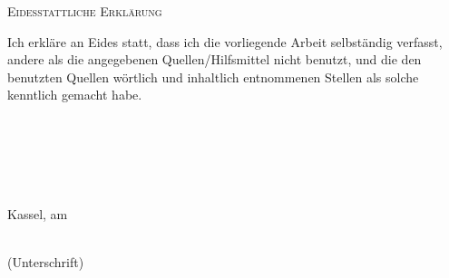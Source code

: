 \thispagestyle{empty}
\begin{center}
    \Large\scshape Eidesstattliche Erklärung
\end{center}
Ich erkläre an Eides statt, dass ich die vorliegende Arbeit selbständig
verfasst, andere als die angegebenen Quellen/Hilfsmittel nicht benutzt, und die
den benutzten Quellen wörtlich und inhaltlich entnommenen Stellen als solche
kenntlich gemacht habe.\\ \\ \\ \\ \\ \\
\vspace{10cm}
\begin{minipage}[h]{0.4\linewidth}
    Kassel, am\dotfill\\
    \vspace*{2.5mm}
\end{minipage}
\hspace*{0.1\linewidth}
\begin{minipage}[h]{0.5\linewidth}
    \begin{center}
        \dotfill\\
        (Unterschrift)
    \end{center}
\end{minipage}
\newpage